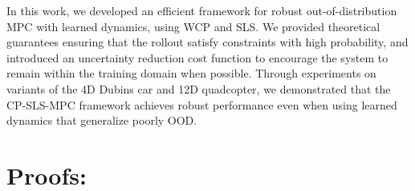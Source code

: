 \documentclass{l4dc2026}
\newcommand{\methodnospace}{CP-SLS-MPC}
\begin{document}
In this work, we developed an efficient framework for robust out-of-distribution MPC with learned dynamics, using WCP and SLS. We provided theoretical guarantees ensuring that the rollout satisfy constraints with high probability, and introduced an uncertainty reduction cost function to encourage the system to remain within the training domain when possible. Through experiments on variants of the 4D Dubins car and 12D quadcopter, we demonstrated that the \methodnospace{} framework achieves robust performance even when using learned dynamics that generalize poorly OOD.


\appendix

\newpage
\section{Proofs:}\label{app:proofs}
\end{document}

